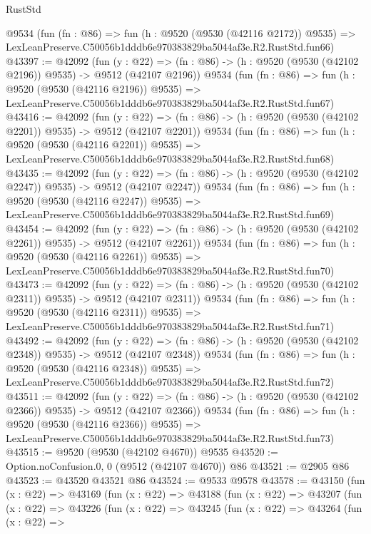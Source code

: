 \begin{lexlean}{RustStd}
\begin{coremodule}
    @9534
    (fun (fn : @86) =>
    fun (h : @9520 (@9530 (@42116 @2172)) @9535) =>
    LexLeanPreserve.C50056b1dddb6e970383829ba5044af3e.R2.RustStd.fun66)
@43397 := @42092
    (fun (y : @22) =>
    (fn : @86) -> (h : @9520 (@9530 (@42102 @2196)) @9535) -> @9512 (@42107 @2196))
    @9534
    (fun (fn : @86) =>
    fun (h : @9520 (@9530 (@42116 @2196)) @9535) =>
    LexLeanPreserve.C50056b1dddb6e970383829ba5044af3e.R2.RustStd.fun67)
@43416 := @42092
    (fun (y : @22) =>
    (fn : @86) -> (h : @9520 (@9530 (@42102 @2201)) @9535) -> @9512 (@42107 @2201))
    @9534
    (fun (fn : @86) =>
    fun (h : @9520 (@9530 (@42116 @2201)) @9535) =>
    LexLeanPreserve.C50056b1dddb6e970383829ba5044af3e.R2.RustStd.fun68)
@43435 := @42092
    (fun (y : @22) =>
    (fn : @86) -> (h : @9520 (@9530 (@42102 @2247)) @9535) -> @9512 (@42107 @2247))
    @9534
    (fun (fn : @86) =>
    fun (h : @9520 (@9530 (@42116 @2247)) @9535) =>
    LexLeanPreserve.C50056b1dddb6e970383829ba5044af3e.R2.RustStd.fun69)
@43454 := @42092
    (fun (y : @22) =>
    (fn : @86) -> (h : @9520 (@9530 (@42102 @2261)) @9535) -> @9512 (@42107 @2261))
    @9534
    (fun (fn : @86) =>
    fun (h : @9520 (@9530 (@42116 @2261)) @9535) =>
    LexLeanPreserve.C50056b1dddb6e970383829ba5044af3e.R2.RustStd.fun70)
@43473 := @42092
    (fun (y : @22) =>
    (fn : @86) -> (h : @9520 (@9530 (@42102 @2311)) @9535) -> @9512 (@42107 @2311))
    @9534
    (fun (fn : @86) =>
    fun (h : @9520 (@9530 (@42116 @2311)) @9535) =>
    LexLeanPreserve.C50056b1dddb6e970383829ba5044af3e.R2.RustStd.fun71)
@43492 := @42092
    (fun (y : @22) =>
    (fn : @86) -> (h : @9520 (@9530 (@42102 @2348)) @9535) -> @9512 (@42107 @2348))
    @9534
    (fun (fn : @86) =>
    fun (h : @9520 (@9530 (@42116 @2348)) @9535) =>
    LexLeanPreserve.C50056b1dddb6e970383829ba5044af3e.R2.RustStd.fun72)
@43511 := @42092
    (fun (y : @22) =>
    (fn : @86) -> (h : @9520 (@9530 (@42102 @2366)) @9535) -> @9512 (@42107 @2366))
    @9534
    (fun (fn : @86) =>
    fun (h : @9520 (@9530 (@42116 @2366)) @9535) =>
    LexLeanPreserve.C50056b1dddb6e970383829ba5044af3e.R2.RustStd.fun73)
@43515 := @9520 (@9530 (@42102 @4670)) @9535
@43520 := Option.noConfusion.{0, 0} (@9512 (@42107 @4670)) @86
@43521 := @2905 @86
@43523 := @43520 @43521 @86
@43524 := @9533 @9578
@43578 := @43150
    (fun (x : @22) =>
    @43169
      (fun (x : @22) =>
      @43188
        (fun (x : @22) =>
        @43207
          (fun (x : @22) =>
          @43226
            (fun (x : @22) =>
            @43245
              (fun (x : @22) =>
              @43264
                (fun (x : @22) =>

\end{coremodule}
\end{lexlean}
